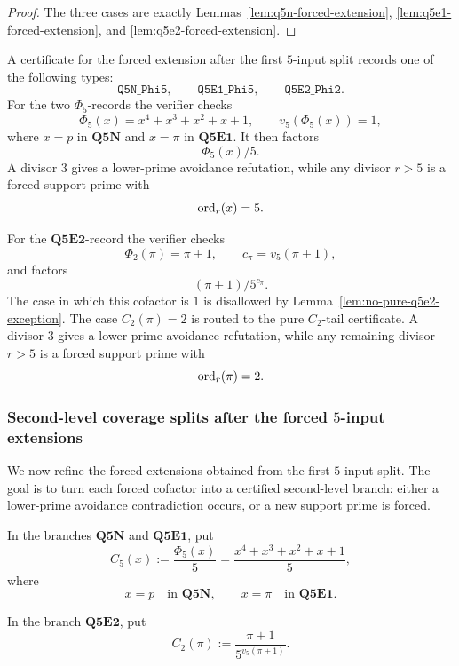 \begin{proof}
The three cases are exactly Lemmas~\ref{lem:q5n-forced-extension},
\ref{lem:q5e1-forced-extension}, and \ref{lem:q5e2-forced-extension}.
\end{proof}

\begin{remark}
A certificate for the forced extension after the first \(5\)-input split records
one of the following types:
\[
  \mathtt{Q5N\_Phi5},
  \qquad
  \mathtt{Q5E1\_Phi5},
  \qquad
  \mathtt{Q5E2\_Phi2}.
\]
For the two \(\Phi_5\)-records the verifier checks
\[
  \Phi_5(x)=x^4+x^3+x^2+x+1,
  \qquad
  v_5(\Phi_5(x))=1,
\]
where \(x=p\) in \(\mathbf{Q5N}\) and \(x=\pi\) in \(\mathbf{Q5E1}\).
It then factors
\[
  \Phi_5(x)/5.
\]
A divisor \(3\) gives a lower-prime avoidance refutation, while any divisor
\(r>5\) is a forced support prime with
\[
  \operatorname{ord}_r(x)=5.
\]

For the \(\mathbf{Q5E2}\)-record the verifier checks
\[
  \Phi_2(\pi)=\pi+1,
  \qquad
  c_\pi=v_5(\pi+1),
\]
and factors
\[
  (\pi+1)/5^{c_\pi}.
\]
The case in which this cofactor is \(1\) is disallowed by
Lemma~\ref{lem:no-pure-q5e2-exception}.  The case \(C_2(\pi)=2\) is routed to
the pure \(C_2\)-tail certificate.  A divisor \(3\) gives a lower-prime
avoidance refutation, while any remaining divisor \(r>5\) is a forced support prime with
\[
  \operatorname{ord}_r(\pi)=2.
\]
\end{remark}

\subsubsection{Second-level coverage splits after the forced $5$-input extensions}

We now refine the forced extensions obtained from the first \(5\)-input split.
The goal is to turn each forced cofactor into a certified second-level branch:
either a lower-prime avoidance contradiction occurs, or a new support prime is
forced.

\begin{definition}[Second-level cofactors in the \(q=5\) branch]
In the branches \(\mathbf{Q5N}\) and \(\mathbf{Q5E1}\), put
\[
  C_5(x):=\frac{\Phi_5(x)}5
  =
  \frac{x^4+x^3+x^2+x+1}{5},
\]
where
\[
  x=p
  \quad\text{in }\mathbf{Q5N},
  \qquad
  x=\pi
  \quad\text{in }\mathbf{Q5E1}.
\]

In the branch \(\mathbf{Q5E2}\), put
\[
  C_2(\pi):=
  \frac{\pi+1}{5^{v_5(\pi+1)}}.
\]
\end{definition}

